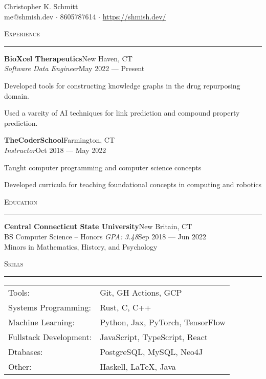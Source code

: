 \documentclass[a4paper]{article}
\newenvironment{cvsection}[1]{%
    \noindent
    \textsc{#1}
    \vspace{4pt}
    \hrule
    \vspace{4pt}
}{\vspace{2pt}}
\newcommand{\school}[6] {
    \noindent\textbf{#1}\hfill#2\\
    \noindent#3 \textit{GPA: #4}\hfill#5\\
    \noindent\vspace{8pt}Minors in #6\\
}
\newcommand{\employer}[5] {
    \noindent\textbf{#1}\hfill#2\\
    \noindent\textit{#3}\hfill#4
    \begin{compactitem}
        #5
    \end{compactitem}
    \vspace{16pt}
}
\begin{document}
    \begin{center}
        {\huge Christopher K. Schmitt}\\
        \vspace{8pt}
        me@shmish.dev $\cdot$ 8605787614 $\cdot$ \href{https://shmish.dev/}{https://shmish.dev/}
    \end{center}

    \begin{cvsection}{Experience}
        \employer{BioXcel Therapeutics}{New Haven, CT}{Software Data Engineer}{May 2022 --- Present}{
            \item Developed tools for constructing knowledge graphs in the drug repurposing domain.
            \item Used a vareity of AI techniques for link prediction and compound property prediction.
        }

        \employer{TheCoderSchool}{Farmington, CT}{Instructor}{Oct 2018 --- May 2022}{
            \item Taught computer programming and computer science concepts
            \item Developed curricula for teaching foundational concepts in computing and robotics
        }
    \end{cvsection}

    \begin{cvsection}{Education}
        \school{Central Connecticut State University}{New Britain, CT}{BS Computer Science -- Honors}{3.48}{Sep 2018 --- Jun 2022}{Mathematics, History, and Psychology}
    \end{cvsection}

    \begin{cvsection}{Skills}
        \begin{tabular}{ l l }
            Tools:                      & Git, GH Actions, GCP\\
            Systems Programming:        & Rust, C, C++\\
            Machine Learning:           & Python, Jax, PyTorch, TensorFlow\\
            Fullstack Development:      & JavaScript, TypeScript, React\\
            Dtabases:                   & PostgreSQL, MySQL, Neo4J\\
            Other:                      & Haskell, LaTeX, Java\\
        \end{tabular}
        \vspace{16pt}
    \end{cvsection}
\end{document}
